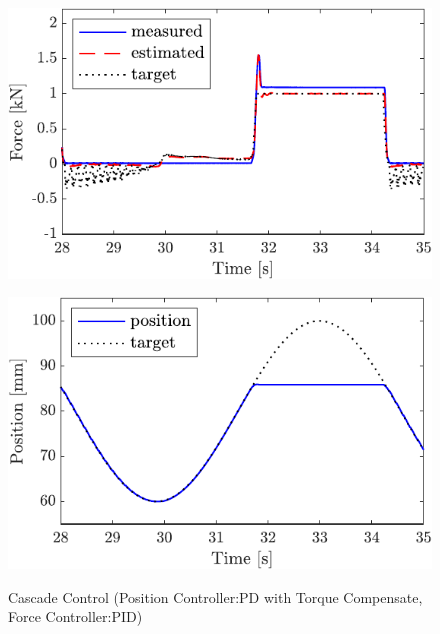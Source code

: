 \begin{figure}[t]
    \begin{minipage}{\minipageratio\hsize}
    \centering
        \includegraphics[keepaspectratio, scale = \minifigscale]{contents/IntegrationControl/figure/SECASQ/crop-FBcsqtch_PID_trq_force.pdf}
        \label{fig5:crop-FBcsqtch_PID_trq_force}
    \end{minipage}
    \begin{minipage}{\minipageratio\hsize}
    \centering
        \includegraphics[keepaspectratio, scale = \minifigscale]{contents/IntegrationControl/figure/SECASQ/crop-FBcsqtch_PID_trq_pos.pdf}
        \label{fig5:crop-FBcsqtch_PID_trq_pos}
    \end{minipage}
    \caption{Cascade Control (Position Controller:PD with Torque Compensate, Force Controller:PID)}  
    \label{fig5:crop-FBcsqtch_PID_trq}
\end{figure}

